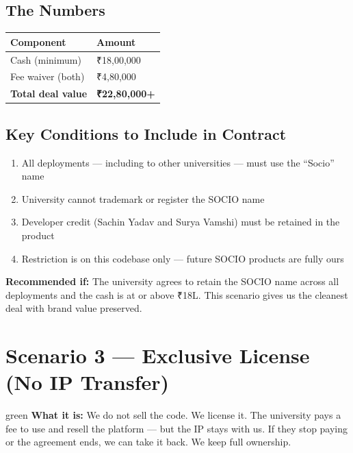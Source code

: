 \documentclass[12pt,a4paper]{article}
\begin{document}
    \subsection*{The Numbers}

    \begin{tabularx}{\textwidth}{L{5cm} X}
    \toprule
    \textbf{Component} & \textbf{Amount} \\
    \midrule
    Cash (minimum) & ₹18,00,000 \\
    Fee waiver (both) & ₹4,80,000 \\
    \textbf{Total deal value} & \textbf{₹22,80,000+} \\
    \bottomrule
    \end{tabularx}

    \subsection*{Key Conditions to Include in Contract}
    \begin{enumerate}[leftmargin=*, noitemsep]
        \item All deployments — including to other universities — must use the ``Socio'' name
        \item University cannot trademark or register the SOCIO name
        \item Developer credit (Sachin Yadav and Surya Vamshi) must be retained in the product
        \item Restriction is on this codebase only — future SOCIO products are fully ours
    \end{enumerate}

    \begin{recommendbox}
    \textbf{Recommended if:} The university agrees to retain the SOCIO name across all deployments and the cash is at or above ₹18L. This scenario gives us the cleanest deal with brand value preserved.
    \end{recommendbox}

    \newpage
    \section{Scenario 3 — Exclusive License (No IP Transfer)}

    \begin{scenariobox}{green}
    \textbf{What it is:} We do not sell the code. We license it. The university pays a fee to use and resell the platform — but the IP stays with us. If they stop paying or the agreement ends, we can take it back. We keep full ownership.
    \end{scenariobox}
\end{document}
